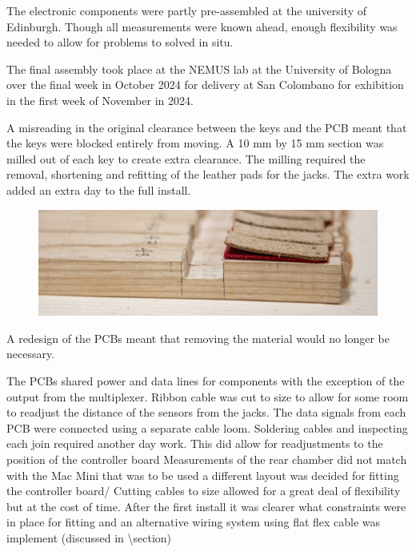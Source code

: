 The electronic components were partly pre-assembled at the university of
Edinburgh. Though all measurements were known ahead, enough flexibility
was needed to allow for problems to solved in situ.

The final assembly took place at the NEMUS lab at the University of
Bologna over the final week in October 2024 for delivery at San
Colombano for exhibition in the first week of November in 2024.

A misreading in the original clearance between the keys and the PCB
meant that the keys were blocked entirely from moving. A 10 mm by 15 mm
section was milled out of each key to create extra
clearance. The milling required the removal, shortening and refitting of
the leather pads for the jacks. The extra work
added an extra day to the full install.

\begin{figure}  
  \centering
  \includegraphics[width=\linewidth]{src/images/milled-keys.jpg} 
  \caption{} 
  \Description{} 
  \label{fig:milling}
\end{figure}

A redesign of the PCBs meant that removing the material would no longer
be necessary.

The PCBs shared power and data lines for components with the exception
of the output from the multiplexer. Ribbon cable was cut to size to
allow for some room to readjust the distance of the sensors from the
jacks. The data signals from each PCB were connected using a separate
cable loom. Soldering cables and inspecting each join required another
day work. This did allow for readjustments to the position of the
controller board Measurements of the rear chamber did not match with the
Mac Mini that was to be used a different layout was decided for fitting
the controller board/ Cutting cables to size allowed for a great deal of
flexibility but at the cost of time. After the first install it was
clearer what constraints were in place for fitting and an alternative
wiring system using flat flex cable was implement (discussed in
\textbackslash section)

